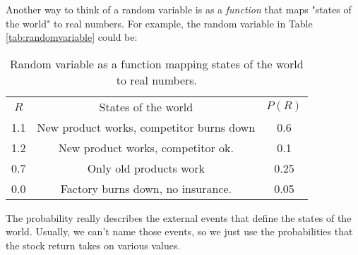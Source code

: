 Another way to think of a random variable is as a
\textit{function} that maps "states of the world" to
real numbers. For example, the random variable in 
Table \ref{tab:randomvariable} could be:

\begin{table}[!htbp]
    \centering
    \begin{tabular}{c c c}
        $R$ & States of the world & $P(R)$ \\
        1.1 & New product works, competitor burns down & 0.6 \\
        1.2 & New product works, competitor ok. & 0.1 \\
        0.7 & Only old products work & 0.25 \\
        0.0 & Factory burns down, no insurance. & 0.05 \\
    \end{tabular}
    \caption{Random variable as a function mapping states of the world to real numbers.}
    \label{tab:statesoftheworld}
\end{table}

The probability really describes the external events 
that define the states of the world. Usually, we 
can't name those events, so we just use the probabilities
that the stock return takes on various values.